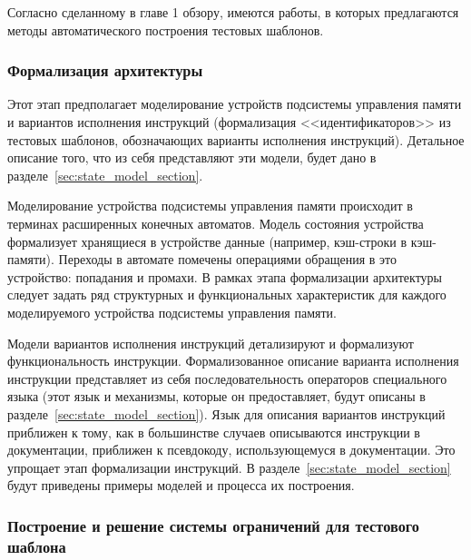 
Согласно сделанному в главе 1 обзору, имеются работы, в которых предлагаются методы автоматического построения тестовых шаблонов.

\subsubsection{Формализация архитектуры}

Этот этап предполагает моделирование устройств подсистемы управления памяти и вариантов исполнения инструкций (формализация <<идентификаторов>> из тестовых шаблонов, обозначающих варианты исполнения инструкций). Детальное описание того, что из себя представляют эти модели, будет дано в разделе~\ref{sec:state_model_section}.

Моделирование устройства подсистемы управления памяти происходит в терминах расширенных конечных автоматов. Модель состояния устройства формализует хранящиеся в устройстве данные (например, кэш-строки в кэш-памяти). Переходы в автомате помечены операциями обращения в это устройство: попадания и промахи. В рамках этапа формализации архитектуры следует задать ряд структурных и функциональных характеристик для каждого моделируемого устройства подсистемы управления памяти.

Модели вариантов исполнения инструкций детализируют и формализуют функциональность инструкции. Формализованное описание варианта исполнения инструкции представляет из себя последовательность операторов специального языка (этот язык и механизмы, которые он предоставляет, будут описаны в разделе~\ref{sec:state_model_section}). Язык для описания вариантов инструкций приближен к тому, как в большинстве случаев описываются инструкции в документации, приближен к псевдокоду, использующемуся в документации. Это упрощает этап формализации инструкций. В разделе~\ref{sec:state_model_section} будут приведены примеры моделей и процесса их построения.

\subsubsection{Построение и решение системы ограничений для тестового шаблона}

